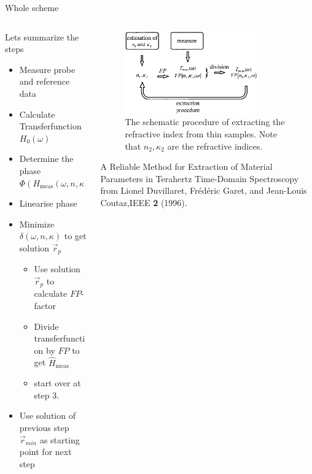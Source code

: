 \documentclass[aspectratio=1610, 9pt]{beamer}
\begin{document}
\begin{frame}{Whole scheme}
  \begin{columns}
    \begin{column}{0.5\textwidth}
      Lets summarize the steps
      \begin{itemize}
        \item[1.] Measure probe and reference data 
        \item[2.] Calculate Transferfunction $H_0(\omega)$
        \item[3.] Determine the phase $\Phi(H_\text{meas}(\omega, n, \kappa))$
        \item[4.] Linearise phase
        \item[5.] Minimize $\delta(\omega, n, \kappa)$ to get solution $\vec{r}_p$
        \begin{itemize}
          \item[a)] Use solution $\vec{r}_p$ to calculate $FP$-factor 
          \item[b)] Divide transferfunction by $FP$ to get $\hat{H}_\text{meas}$
          \item[c)] start over at step 3. 
        \end{itemize}
        \item[6.] Use solution of previous step $\vec{r}_{min}$ as starting point for next step 
      \end{itemize}
    \end{column}
    \begin{column}{0.5\textwidth}
      \begin{figure}
        \includegraphics[width=0.8\textwidth]{images/procedure_fp.jpg}
        \caption{The schematic procedure of extracting the refractive index from thin samples. Note that $n_2, \kappa_2$ are the refractive indices.}
      \end{figure}
      \textcolor{tugreen}{A Reliable Method for Extraction of Material Parameters in Terahertz Time-Domain Spectroscopy} from Lionel Duvillaret, Frédéric Garet, and Jean-Louis Coutaz,IEEE \textbf{2} (1996).
  \end{column}
\end{columns}
\end{frame}
\end{document}
